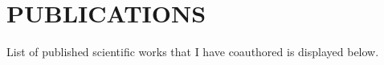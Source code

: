 \documentclass[line,margin]{res}
\begin{document}
\nocite{*}

\newpage
\section{PUBLICATIONS}
List of published scientific works that I have coauthored is displayed below. \\

\renewcommand{\section}[2]{}%

\let\oldbibliography\thebibliography
\renewcommand{\thebibliography}[1]{%
  \oldbibliography{#1}%
  \leftskip=-\hoffset
}



\end{document}

